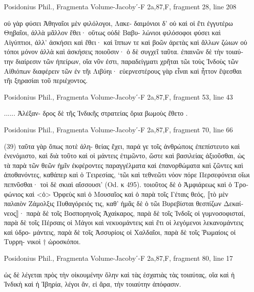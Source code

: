 \documentclass[12pt,letterpaper,twoside,final]{memoir}
\begin{document}
\begin{greek}
Posidonius Phil., Fragmenta 
Volume-Jacobyʹ-F 2a,87,F, fragment 28, line 208

                                               οὐ γὰρ φύσει Ἀθηναῖοι μὲν φιλόλογοι, Λακε-
δαιμόνιοι δ' οὐ καὶ οἱ ἔτι ἐγγυτέρω Θηβαῖοι, ἀλλὰ μᾶλλον ἔθει· οὕτως οὐδὲ Βαβυ-
λώνιοι φιλόσοφοι φύσει καὶ Αἰγύπτιοι, ἀλλ' ἀσκήσει καὶ ἔθει· καὶ ἵππων τε καὶ 
βοῶν ἀρετὰς καὶ ἄλλων ζώιων οὐ τόποι μόνον ἀλλὰ καὶ ἀσκήσεις ποιοῦσιν· ὁ δὲ 
συγχεῖ ταῦτα. 
 ἐπαινῶν δὲ τὴν τοιαύτην διαίρεσιν τῶν ἠπείρων, οἵα νῦν ἐστι, 
παραδείγματι χρῆται τῶι τοὺς Ἰνδοὺς τῶν Αἰθιόπων διαφέρειν τῶν ἐν 
τῆι Λιβύηι· εὐερνεστέρους γὰρ εἶναι καὶ ἧττον ἕψεσθαι τῆι ξηρασίαι τοῦ 
περιέχοντος. 



Posidonius Phil., Fragmenta 
Volume-Jacobyʹ-F 2a,87,F, fragment 53, line 43

                                                                                  ...... Ἀλέξαν-
δρος δὲ τῆς Ἰνδικῆς στρατείας ὅρια βωμοὺς ἔθετο . 



Posidonius Phil., Fragmenta 
Volume-Jacobyʹ-F 2a,87,F, fragment 70, line 66

                                                (39) ταῦτα γὰρ ὅπως ποτὲ ἀλη-
θείας ἔχει, παρά γε τοῖς ἀνθρώποις ἐπεπίστευτο καὶ ἐνενόμιστο, καὶ διὰ τοῦτο καὶ 
οἱ μάντεις ἐτιμῶντο, ὥστε καὶ βασιλείας ἀξιοῦσθαι, ὡς τὰ παρὰ τῶν θεῶν ἡμῖν 
ἐκφέροντες παραγγέλματα καὶ ἐπανορθώματα καὶ ζῶντες καὶ ἀποθανόντες, καθάπερ 
καὶ ὁ Τειρεσίας, ‘τῶι καὶ τεθνεῶτι νόον πόρε Περσεφόνεια οἴωι πεπνῦσθαι· τοὶ δὲ 
σκιαὶ αἴσσουσι’ (Od. κ 495). τοιοῦτος δὲ ὁ Ἀμφιάρεως καὶ ὁ Τροφώνιος καὶ <ὁ> 
Ὀρφεὺς καὶ ὁ Μουσαῖος καὶ ὁ παρὰ τοῖς Γέταις θεός, ⟦τὸ μὲν παλαιὸν Ζάμολξις 
Πυθαγόρειός τις, καθ' ἡμᾶς δὲ ὁ τῶι Βυρεβίσται θεσπίζων Δεκαίνεος⟧· παρὰ δὲ 
τοῖς Βοσπορηνοῖς Ἀχαίκαρος, παρὰ δὲ τοῖς Ἰνδοῖς οἱ γυμνοσοφισταί, παρὰ δὲ τοῖς 
Πέρσαις οἱ Μάγοι καὶ νεκυομάντεις καὶ ἔτι οἱ λεγόμενοι λεκανομάντεις καὶ ὑδρο-
μάντεις, παρὰ δὲ τοῖς Ἀσσυρίοις οἱ Χαλδαῖοι, παρὰ δὲ τοῖς Ῥωμαίοις οἱ Τυρρη-
νικοὶ † ὡροσκόποι. 



Posidonius Phil., Fragmenta 
Volume-Jacobyʹ-F 2a,87,F, fragment 80, line 17

                                                                                           ὡς 
δὲ λέγεται πρὸς τὴν οἰκουμένην ὅλην καὶ τὰς ἐσχατιὰς τὰς τοιαύτας, οἵα καὶ ἡ 
Ἰνδικὴ καὶ ἡ Ἰβηρία, λέγοι ἄν, εἰ ἄρα, τὴν τοιαύτην ἀπόφασιν. 




\end{greek}
\end{document}

